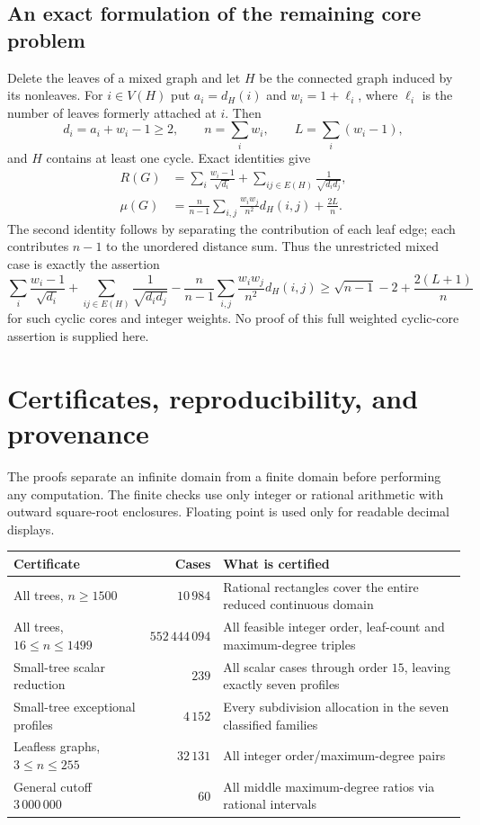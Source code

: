 \documentclass[11pt,a4paper]{article}
\theoremstyle{remark}
\numberwithin{equation}{section}
\begin{document}
\subsection{An exact formulation of the remaining core problem}

Delete the leaves of a mixed graph and let $H$ be the connected graph
induced by its nonleaves. For $i\in V(H)$ put
$a_i=d_H(i)$ and $w_i=1+\ell_i$, where $\ell_i$ is the number of
leaves formerly attached at $i$. Then
\[
 d_i=a_i+w_i-1\ge2,\qquad
 n=\sum_iw_i,\qquad L=\sum_i(w_i-1),
\]
and $H$ contains at least one cycle. Exact identities give
\[
 \begin{split}
 R(G)&=\sum_i\frac{w_i-1}{\sqrt{d_i}}
        +\sum_{ij\in E(H)}\frac1{\sqrt{d_id_j}},\\
 \mu(G)&=\frac n{n-1}\sum_{i,j}\frac{w_iw_j}{n^2}d_H(i,j)
                  +\frac{2L}{n}.
 \end{split}
\]
The second identity follows by separating the contribution of each leaf
edge; each contributes $n-1$ to the unordered distance sum.
Thus the unrestricted mixed case is exactly the assertion
\[
 \sum_i\frac{w_i-1}{\sqrt{d_i}}
 +\sum_{ij\in E(H)}\frac1{\sqrt{d_id_j}}
 -\frac n{n-1}\sum_{i,j}\frac{w_iw_j}{n^2}d_H(i,j)
 \ge\sqrt{n-1}-2+\frac{2(L+1)}n
\]
for such cyclic cores and integer weights. No proof of this full
weighted cyclic-core assertion is supplied here.

\section{Certificates, reproducibility, and provenance}

The proofs separate an infinite domain from a finite domain before
performing any computation. The finite checks use only integer or
rational arithmetic with outward square-root enclosures.
Floating point is used only for readable decimal displays.

\begin{center}\small
\begin{tabularx}{\linewidth}{@{}>{\raggedright\arraybackslash}p{.34\linewidth}
 r X@{}}
\toprule
Certificate & Cases & What is certified\\
\midrule
All trees, $n\ge1500$ & $10\,984$ &
Rational rectangles cover the entire reduced continuous domain\\
All trees, $16\le n\le1499$ & $552\,444\,094$ &
All feasible integer order, leaf-count and maximum-degree triples\\
Small-tree scalar reduction & $239$ &
All scalar cases through order $15$, leaving exactly seven profiles\\
Small-tree exceptional profiles & $4\,152$ &
Every subdivision allocation in the seven classified families\\
Leafless graphs, $3\le n\le255$ & $32\,131$ &
All integer order/maximum-degree pairs\\
General cutoff $3\,000\,000$ & $60$ &
All middle maximum-degree ratios via rational intervals\\
\bottomrule
\end{tabularx}
\end{center}
\end{document}
